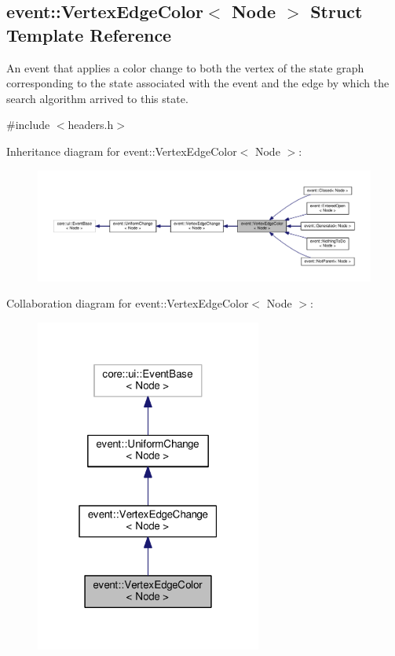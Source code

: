 \hypertarget{structevent_1_1VertexEdgeColor}{}\subsection{event\+:\+:Vertex\+Edge\+Color$<$ Node $>$ Struct Template Reference}
\label{structevent_1_1VertexEdgeColor}


An event that applies a color change to both the vertex of the state graph corresponding to the state associated with the event and the edge by which the search algorithm arrived to this state.  




{\ttfamily \#include $<$headers.\+h$>$}



Inheritance diagram for event\+:\+:Vertex\+Edge\+Color$<$ Node $>$\+:\nopagebreak
\begin{figure}[H]
\begin{center}
\leavevmode
\includegraphics[width=350pt]{structevent_1_1VertexEdgeColor__inherit__graph}
\end{center}
\end{figure}


Collaboration diagram for event\+:\+:Vertex\+Edge\+Color$<$ Node $>$\+:\nopagebreak
\begin{figure}[H]
\begin{center}
\leavevmode
\includegraphics[width=211pt]{structevent_1_1VertexEdgeColor__coll__graph}
\end{center}
\end{figure}
